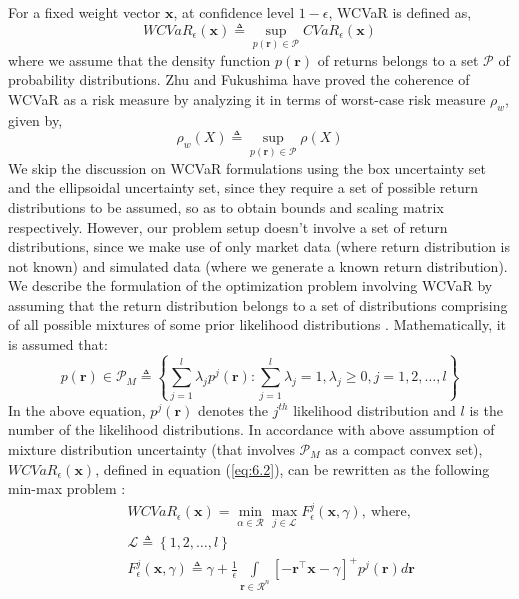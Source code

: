 \documentclass[12pt]{article}
\numberwithin{equation}{section}
\begin{document}
For a fixed weight vector $\mathbf{x}$, at confidence level $1-\epsilon$, WCVaR is defined as,
\begin{equation}
WCVaR_{\epsilon}(\mathbf{x}) \triangleq \sup_{p(\mathbf{r}) \in \mathcal{P}}CVaR_{\epsilon}(\mathbf{x})
\label{eq:6.2}
\end{equation}
where we assume that the density function $p(\mathbf{r})$ of returns belongs to a set $\mathcal{P}$ of probability distributions. Zhu and Fukushima \cite{zhu} have proved the coherence of WCVaR as a risk measure by analyzing it in terms of worst-case risk measure $\rho_{w}$, given by,
\begin{equation}
\rho_{w}(X) \triangleq \sup_{p(\mathbf{r}) \in \mathcal{P}} \rho (X)
\label{eq:6.3}
\end{equation}
We skip the discussion on WCVaR formulations using the box uncertainty set and the ellipsoidal uncertainty set, since they require a set of possible return distributions to be assumed, so as to obtain bounds and scaling matrix respectively. However, our problem setup doesn't involve a set of return distributions, since we make use of only market data (where return distribution is not known) and simulated data (where we generate a known return distribution). We describe the formulation of the optimization problem involving WCVaR by assuming that the return distribution belongs to a set of distributions comprising of all possible mixtures of some prior likelihood distributions \cite{zhu}. Mathematically, it is assumed that:
\begin{equation}
p(\mathbf{r}) \in \mathcal{P}_{M} \triangleq \left\{\sum\limits_{j=1}^{l} \lambda_{j}p^{j}(\mathbf{r}):\sum\limits_{j=1}^{l}\lambda_{j}=1,
\lambda_{j} \geq 0,j=1,2,\dots,l \right\}
\label{eq:6.8}
\end{equation}
In the above equation, $p^{j}(\mathbf{r})$ denotes the $j^{th}$ likelihood distribution and $l$ is the number of the likelihood distributions. In accordance with above assumption of mixture distribution uncertainty (that involves $\mathcal{P}_{M}$ as a compact convex set), $WCVaR_{\epsilon}(\mathbf{x})$, defined in equation (\ref{eq:6.2}), can be rewritten as the following min-max problem \cite{zhu}:
\begin{eqnarray}
&& WCVaR_{\epsilon}(\mathbf{x})=\min_{\alpha \in \mathcal{R}} \max_{j \in \mathcal{L}} F_{\epsilon}^{j}(\mathbf{x},\gamma),~\text{where},\\ \nonumber
&& \mathcal{L} \triangleq \left\{1,2,\dots,l\right\} \\
&& F_{\epsilon}^{j}(\mathbf{x},\gamma) \triangleq \gamma+\frac{1}{\epsilon}\int \limits_{\mathbf{r} \in \mathcal{R}^{n}}
\left[-\mathbf{r}^{\top}\mathbf{x}-\gamma\right]^{+} p^{j}(\mathbf{r}) d\mathbf{r} \nonumber
\label{eq:6.9}
\end{eqnarray}
\end{document}
